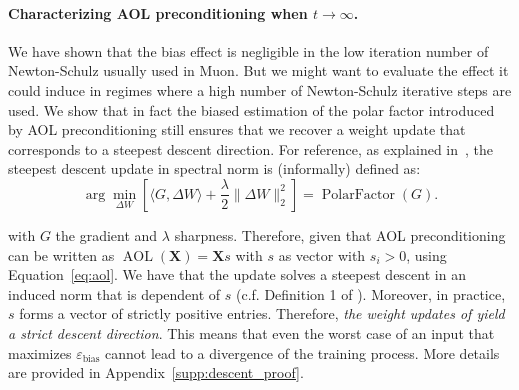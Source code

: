 \paragraph{Characterizing AOL preconditioning when $t \rightarrow \infty$.}
We have shown that the bias effect is negligible in the low iteration number of Newton-Schulz usually used in Muon. But we might want to evaluate the effect it could induce in regimes where a high number of Newton-Schulz iterative steps are used. We show that in fact the biased estimation of the polar factor introduced by AOL preconditioning still ensures that we recover a weight update that corresponds to a steepest descent direction. For reference, as explained in~\cite{bernstein2024oldoptimizernewnorm}, 
the steepest descent update in spectral norm is (informally) defined as:
\vspace{1mm}
\begin{equation}
    \arg \min_{\Delta W} \left[ \langle G, \Delta W \rangle + \frac{\lambda}{2} \| \Delta W \|_2^2 \right] = \operatorname{PolarFactor}(G).
\label{eq:spectral_descent}
\end{equation}
\vspace{1mm}

\noindent with $G$ the gradient and $\lambda$ sharpness. Therefore, given that AOL preconditioning can be written as $\operatorname{AOL}(\mathbf{X}) = \mathbf{X}s$ with $s$ as vector with $s_i > 0$,  using Equation~\ref{eq:aol}. We have that the \turbomuon update solves a steepest descent in an induced norm that is dependent of $s$ (c.f. Definition 1 of \cite{bernstein2024oldoptimizernewnorm}).
Moreover, in practice, $s$ forms a vector of strictly positive entries. Therefore, \textit{the weight updates of \turbomuon yield a strict descent direction}. This means that even the worst case of an input that maximizes $\varepsilon_{\text{bias}}$ cannot lead to a divergence of the training process. More details are provided in Appendix~\ref{supp:descent_proof}.


